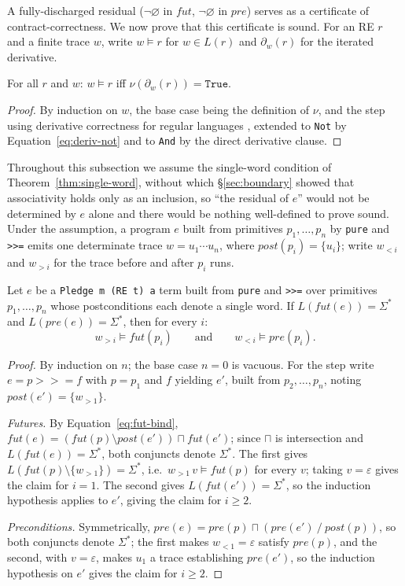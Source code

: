 \documentclass[acmsmall,screen]{acmart}
\newcommand{\RE}{\mathsf{RE}}
\newcommand{\pre}{\mathit{pre}}
\newcommand{\post}{\mathit{post}}
\newcommand{\fut}{\mathit{fut}}
\newcommand{\univ}{\neg\varnothing}
\newcommand{\lquot}{\mathbin{\setminus}}   %
\newcommand{\rquot}{\mathbin{/}}           %
\begin{document}
A fully-discharged residual ($\univ$ in $\fut$, $\univ$ in $\pre$) serves as
a certificate of contract-correctness.
We now prove that this certificate is sound.
For an RE $r$ and a finite trace $w$, write $w \models r$ for $w \in L(r)$
and $\partial_w(r)$ for the iterated derivative.

\begin{lemma}
\label{lem:deriv-correct}
For all $r$ and $w$: $w \models r$ iff $\nu(\partial_w(r)) = \mathtt{True}$.
\end{lemma}
\begin{proof}
By induction on $w$, the base case being the definition of $\nu$, and the
step using derivative correctness for regular languages
\cite{brzozowski1964}, extended to \lstinline{Not} by
Equation~\eqref{eq:deriv-not} and to \lstinline{And} by the direct
derivative clause.
\end{proof}

Throughout this subsection we assume the single-word condition of
Theorem~\ref{thm:single-word}, without which \S\ref{sec:boundary} showed
that associativity holds only as an inclusion, so ``the residual of $e$''
would not be determined by $e$ alone and there would be nothing
well-defined to prove sound.
Under the assumption, a program $e$ built from primitives $p_1, \dots, p_n$
by \lstinline{pure} and \lstinline{>>=} emits one determinate trace
$w = u_1 \cdots u_n$, where $\post(p_i) = \{u_i\}$; write $w_{<i}$ and
$w_{>i}$ for the trace before and after $p_i$ runs.

\begin{theorem}[Soundness of $\RE$-residual checking]
\label{thm:soundness}
Let $e$ be a \lstinline{Pledge m (RE t) a} term built from \lstinline{pure}
and \lstinline{>>=} over primitives $p_1, \dots, p_n$ whose postconditions
each denote a single word.
If $L(\fut(e)) = \Sigma^*$ and $L(\pre(e)) = \Sigma^*$, then for every $i$:
\[
  w_{>i} \models \fut(p_i)
  \qquad\text{and}\qquad
  w_{<i} \models \pre(p_i).
\]
\end{theorem}
\begin{proof}
By induction on $n$; the base case $n = 0$ is vacuous.
For the step write $e = p \mathbin{>\!\!>\!\!=} f$ with $p = p_1$ and $f$
yielding $e'$, built from $p_2, \dots, p_n$, noting
$\post(e') = \{w_{>1}\}$.

\emph{Futures.} By Equation~\eqref{eq:fut-bind},
$\fut(e) = (\fut(p) \lquot \post(e')) \sqcap \fut(e')$; since $\sqcap$ is
intersection and $L(\fut(e)) = \Sigma^*$, both conjuncts denote $\Sigma^*$.
The first gives $L(\fut(p) \lquot \{w_{>1}\}) = \Sigma^*$, i.e.\
$w_{>1}\,v \models \fut(p)$ for every $v$; taking $v = \varepsilon$ gives
the claim for $i = 1$.
The second gives $L(\fut(e')) = \Sigma^*$, so the induction hypothesis
applies to $e'$, giving the claim for $i \geq 2$.

\emph{Preconditions.} Symmetrically,
$\pre(e) = \pre(p) \sqcap (\pre(e') \rquot \post(p))$, so both conjuncts
denote $\Sigma^*$; the first makes $w_{<1} = \varepsilon$ satisfy
$\pre(p)$, and the second, with $v = \varepsilon$, makes $u_1$ a trace
establishing $\pre(e')$, so the induction hypothesis on $e'$ gives the
claim for $i \geq 2$.
\end{proof}
\end{document}

